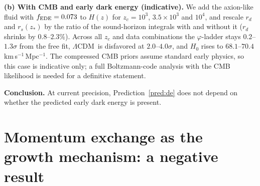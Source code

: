 \documentclass[11pt]{article}
\theoremstyle{definition}
\theoremstyle{remark}
\newcommand{\gr}{\varphi}
\newcommand{\LCDM}{$\Lambda$CDM}
\newcommand{\fede}{f_{\rm EDE}}
\begin{document}
\textbf{(b) With CMB and early dark energy (indicative).} We add the axion-like fluid with $\fede = 0.073$ to $H(z)$ for $z_c = 10^3$, $3.5\times10^3$ and $10^4$, and rescale $r_d$ and $r_s(z_*)$ by the ratio of the sound-horizon integrals with and without it ($r_d$ shrinks by $0.8$--$2.3\%$). Across all $z_c$ and data combinations the $\gr$-ladder stays $0.2$--$1.3\sigma$ from the free fit, \LCDM\ is disfavored at $2.0$--$4.0\sigma$, and $H_0$ rises to $68.1$--$70.4$\,km\,s$^{-1}$\,Mpc$^{-1}$. The compressed CMB priors assume standard early physics, so this case is indicative only; a full Boltzmann-code analysis with the CMB likelihood is needed for a definitive statement.

\textbf{Conclusion.} At current precision, Prediction~\ref{pred:de} does not depend on whether the predicted early dark energy is present.

\section{Momentum exchange as the growth mechanism: a negative result}\label{sec:drag}
\end{document}
